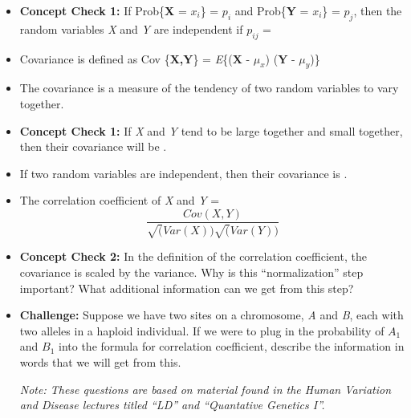 \documentclass[12pt]{report}
\begin{document}
\begin{itemize}

\item \textbf{Concept Check 1:} If Prob\{\textbf{X} = \textit{$x_{i}$}\} = $p_{i}$ and Prob\{\textbf{Y} = $x_{i}$\} = \textit{$p_{j}$}, then the random variables \textit{X} and \textit{Y} are independent if \textit{$p_{ij}$} = \hrulefill

\item Covariance is defined as Cov \{\textbf{X,Y}\} =  \textit{E}\{\big($\textbf{X - $\mu_{x}$}$\big) \big($\textbf{Y - $\mu_{y}$}$\big)\}

\item The covariance is a measure of the tendency of two random variables to vary together. 

\bigskip
\item \textbf{Concept Check 1:} If \textit{X} and \textit{Y} tend to be large together and small together, then their covariance will be \hrulefill. 

\item If two random variables are independent, then their covariance is \hrulefill.

\item The correlation coefficient of \textit{X} and \textit{Y} = \[\frac{Cov(X, Y)}{\sqrt(Var (X))\sqrt(Var (Y))} \] 

\bigskip
\item \textbf{Concept Check 2:} In the definition of the correlation coefficient, the covariance is scaled by the variance. Why is this ``normalization'' step important? What additional information can we get from this step?

\bigskip

\bigskip

\bigskip
\item \textbf{Challenge:} Suppose we have two sites on a chromosome, \textit{A} and \textit{B}, each with two alleles in a haploid individual. If we were to plug in the probability of \textit{$A_{1}$} and \textit{$B_{1}$} into the formula for correlation coefficient, describe the information in words that we will get from this.

\bigskip

\bigskip

\bigskip
\textit{Note: These questions are based on material found in the Human Variation and Disease lectures titled ``LD'' and ``Quantative Genetics I''.}


 \end{itemize}
\end{document}
